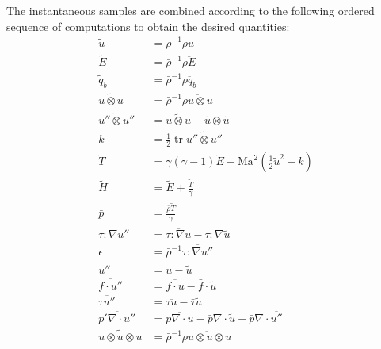 \documentclass[letterpaper,11pt,nointlimits,reqno]{amsart}
\newcommand{\Mach}[1][]{\ensuremath{\mbox{Ma}_{#1}}}
\DeclareMathOperator{\trace}{tr}
\begin{document}
The instantaneous samples are combined according to the following ordered
sequence of computations to obtain the desired quantities:
{ \allowdisplaybreaks[1]
\begin{align}
  \tilde{u} &= \bar{\rho}^{-1} \overline{\rho{}u}
\\
  \tilde{E} &= \bar{\rho}^{-1} {\overline{\rho{}E}}
\\
  \tilde{q}_{b} &= \bar{\rho}^{-1} \overline{\rho{}q_{b}}
\\
  \widetilde{u\otimes{}u} &= \bar{\rho}^{-1} \overline{\rho{}u\otimes{}u}
\\
  \widetilde{u''\otimes{}u''} &=
  \widetilde{u\otimes{}u} - \tilde{u}\otimes\tilde{u}
\\
  k &= \frac{1}{2} \trace \widetilde{u''\otimes{}u''}
\\
  \tilde{T} &=
  \gamma\left(\gamma-1\right)\tilde{E}
  - \Mach^2\left(\frac{1}{2}\tilde{u}^2 + k\right)
\\
  \tilde{H} &= \tilde{E} + \frac{\tilde{T}}{\gamma}
\\
  \bar{p} &= \frac{\bar{\rho}\tilde{T}}{\gamma}
\\
  \overline{\tau:\nabla{}u''} &=
  \overline{\tau:\nabla{}u} - \bar{\tau}:\nabla\tilde{u}
\\
  \epsilon &= \bar{\rho}^{-1} \overline{\tau:\nabla{}u''}
\\
  \overline{u''} &= \bar{u} - \tilde{u}
\\
  \overline{f\cdot{}u''} &= \overline{f\cdot{}u} - \bar{f}\cdot{}\tilde{u}
\\
  \overline{\tau{}u''} &= \overline{\tau{}u} - \bar{\tau}\tilde{u}
\\
  \overline{p'\nabla\cdot{}u''}
  &= \overline{p\nabla\cdot{}u}
   - \bar{p}\nabla\cdot\tilde{u}
   - \bar{p}\nabla\cdot\overline{u''}
\\
  \widetilde{u\otimes{}u\otimes{}u}
  &= \bar{\rho}^{-1} \overline{\rho{}u\otimes{}u\otimes{}u}
\end{align}
}
\end{document}
